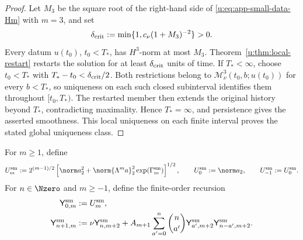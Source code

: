 \begin{proof}
Let \(M_3\) be the square root of the right-hand side of
\eqref{u:eq:app-small-data-Hm} with \(m=3\), and set
\[
 \delta_{\rm crit}
 :=\min\{1,c_\nu(1+M_3)^{-2}\}>0.
\]
Every datum \(u(t_0)\), \(t_0<T_*\), has \(H^3\)-norm at most \(M_3\).
Theorem~\ref{u:thm:local-restart} restarts the solution for at least
\(\delta_{\rm crit}\) units of time.  If \(T_*<\infty\), choose
\(t_0<T_*\) with \(T_*-t_0<\delta_{\rm crit}/2\).  Both restrictions belong
to \(\mathscr M_\nu^3(t_0,b;u(t_0))\) for every \(b<T_*\), so uniqueness on
each such closed subinterval identifies them throughout \([t_0,T_*)\).
The restarted member then extends the original history beyond \(T_*\),
contradicting maximality.  Hence \(T_*=\infty\), and persistence
 gives the asserted smoothness.  This local uniqueness on each finite
 interval proves the stated global uniqueness class.
\end{proof}

For \(m\ge1\), define
\[
 U_m^{\rm sm}
 :=
 2^{(m-1)/2}
 \left[
 \norm a_2^2+
 \norm{\Lambda^ma}_2^2\exp(\Gamma_m^{\rm sm})
 \right]^{1/2},
 \qquad
 U_0^{\rm sm}:=\norm a_2,
 \qquad
 U_{-1}^{\rm sm}:=U_0^{\rm sm}.
\]
For \(n\in\Nzero\) and \(m\ge-1\), define the finite-order recursion
\begin{align}
 \mathsf Y_{0,m}^{\rm sm}&:=U_m^{\rm sm},
 \label{u:eq:app-small-Y0}\\
 \mathsf Y_{n+1,m}^{\rm sm}
 &:=
 \nu\mathsf Y_{n,m+2}^{\rm sm}
 +A_{m+1}\sum_{a'=0}^{n}\binom n{a'}
 \mathsf Y_{a',m+2}^{\rm sm}
 \mathsf Y_{n-a',m+2}^{\rm sm}.
 \label{u:eq:app-small-Yrec}
\end{align}

